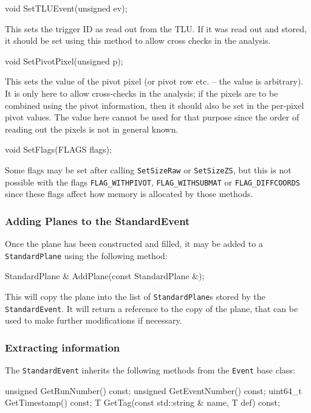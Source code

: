 \begin{listing}
void SetTLUEvent(unsigned ev);
\end{listing}

This sets the trigger ID as read out from the \gls{TLU}.
If it was read out and stored, it should be set using this method to allow cross checks in the analysis.

\begin{listing}
void SetPivotPixel(unsigned p);
\end{listing}

This sets the value of the pivot pixel (or pivot row etc. -- the value is arbitrary).
It is only here to allow cross-checks in the analysis;
if the pixels are to be combined using the pivot information,
then it should also be set in the per-pixel pivot values.
The value here cannot be used for that purpose since the order of reading out the pixels is not in general known.

\begin{listing}
void SetFlags(FLAGS flags);
\end{listing}

Some flags may be set after calling \texttt{SetSizeRaw} or \texttt{SetSizeZS}, but this is not possible with the flags
\texttt{FLAG\_WITHPIVOT}, \texttt{FLAG\_WITHSUBMAT} or \texttt{FLAG\_DIFFCOORDS} since these
flags affect how memory is allocated by those methods.

\subsubsection{Adding Planes to the StandardEvent}
Once the plane has been constructed and filled, it may be added to a \texttt{StandardPlane} using the following method:
\begin{listing}
StandardPlane & AddPlane(const StandardPlane &);
\end{listing}

This will copy the plane into the list of \texttt{StandardPlane}s stored by the \texttt{StandardEvent}.
It will return a reference to the copy of the plane, that can be used to make further modifications if necessary.

\subsubsection{Extracting information}
The \texttt{StandardEvent} inherits the following methods from the \texttt{Event} base class:
\begin{listing}
unsigned GetRunNumber() const;
unsigned GetEventNumber() const;
uint64_t GetTimestamp() const;
T GetTag(const std::string & name, T def) const;
\end{listing}

